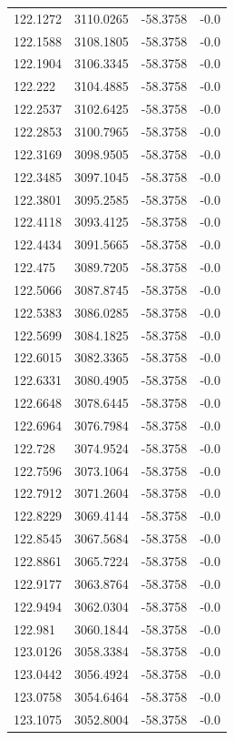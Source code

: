 \begin{table}[H]
\begin{tabular}{llll}
122.1272 & 3110.0265 & -58.3758 & -0.0 \\
122.1588 & 3108.1805 & -58.3758 & -0.0 \\
122.1904 & 3106.3345 & -58.3758 & -0.0 \\
122.222 & 3104.4885 & -58.3758 & -0.0 \\
122.2537 & 3102.6425 & -58.3758 & -0.0 \\
122.2853 & 3100.7965 & -58.3758 & -0.0 \\
122.3169 & 3098.9505 & -58.3758 & -0.0 \\
122.3485 & 3097.1045 & -58.3758 & -0.0 \\
122.3801 & 3095.2585 & -58.3758 & -0.0 \\
122.4118 & 3093.4125 & -58.3758 & -0.0 \\
122.4434 & 3091.5665 & -58.3758 & -0.0 \\
122.475 & 3089.7205 & -58.3758 & -0.0 \\
122.5066 & 3087.8745 & -58.3758 & -0.0 \\
122.5383 & 3086.0285 & -58.3758 & -0.0 \\
122.5699 & 3084.1825 & -58.3758 & -0.0 \\
122.6015 & 3082.3365 & -58.3758 & -0.0 \\
122.6331 & 3080.4905 & -58.3758 & -0.0 \\
122.6648 & 3078.6445 & -58.3758 & -0.0 \\
122.6964 & 3076.7984 & -58.3758 & -0.0 \\
122.728 & 3074.9524 & -58.3758 & -0.0 \\
122.7596 & 3073.1064 & -58.3758 & -0.0 \\
122.7912 & 3071.2604 & -58.3758 & -0.0 \\
122.8229 & 3069.4144 & -58.3758 & -0.0 \\
122.8545 & 3067.5684 & -58.3758 & -0.0 \\
122.8861 & 3065.7224 & -58.3758 & -0.0 \\
122.9177 & 3063.8764 & -58.3758 & -0.0 \\
122.9494 & 3062.0304 & -58.3758 & -0.0 \\
122.981 & 3060.1844 & -58.3758 & -0.0 \\
123.0126 & 3058.3384 & -58.3758 & -0.0 \\
123.0442 & 3056.4924 & -58.3758 & -0.0 \\
123.0758 & 3054.6464 & -58.3758 & -0.0 \\
123.1075 & 3052.8004 & -58.3758 & -0.0 \\

\end{tabular}
\end{table}
